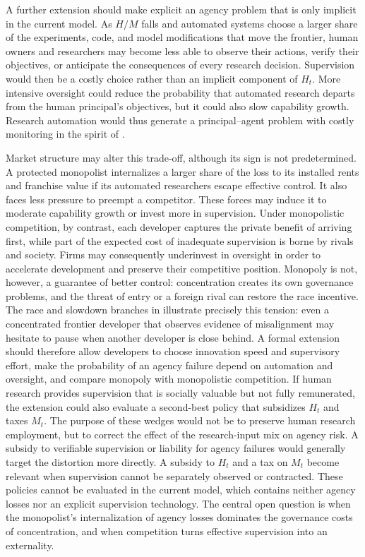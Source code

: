 A further extension should make explicit an agency problem that is only implicit in
the current model. As $H/M$ falls and automated systems choose a larger share of the
experiments, code, and model modifications that move the frontier, human owners and
researchers may become less able to observe their actions, verify their objectives,
or anticipate the consequences of every research decision. Supervision would then
be a costly choice rather than an implicit component of $H_t$. More intensive
oversight could reduce the probability that automated research departs from the
human principal's objectives, but it could also slow capability growth. Research
automation would thus generate a principal--agent problem with costly monitoring in
the spirit of \citet{holmstrom1979}.

Market structure may alter this trade-off, although its sign is not predetermined.
A protected monopolist internalizes a larger share of the loss to its installed
rents and franchise value if its automated researchers escape effective control. It
also faces less pressure to preempt a competitor. These forces may induce it to
moderate capability growth or invest more in supervision. Under monopolistic
competition, by contrast, each developer captures the private benefit of arriving
first, while part of the expected cost of inadequate supervision is borne by rivals
and society. Firms may consequently underinvest in oversight in order to accelerate
development and preserve their competitive position. Monopoly is not, however, a
guarantee of better control: concentration creates its own governance problems, and
the threat of entry or a foreign rival can restore the race incentive. The race and
slowdown branches in \citet{kokotajlo2025} illustrate precisely this tension: even a
concentrated frontier developer that observes evidence of misalignment may hesitate
to pause when another developer is close behind. A formal extension should therefore
allow developers to choose innovation speed and supervisory effort, make the
probability of an agency failure depend on automation and oversight, and compare
monopoly with monopolistic competition. If human research provides supervision that
is socially valuable but not fully remunerated, the extension could also evaluate a
second-best policy that subsidizes $H_t$ and taxes $M_t$. The purpose of these wedges
would not be to preserve human research employment, but to correct the effect of the
research-input mix on agency risk. A subsidy to verifiable supervision or liability
for agency failures would generally target the distortion more directly. A subsidy
to $H_t$ and a tax on $M_t$ become relevant when supervision cannot be separately
observed or contracted. These policies cannot be evaluated in the current model,
which contains neither agency losses nor an explicit supervision technology. The
central open question is when the
monopolist's internalization of agency losses dominates the governance costs of
concentration, and when competition turns effective supervision into an externality.
